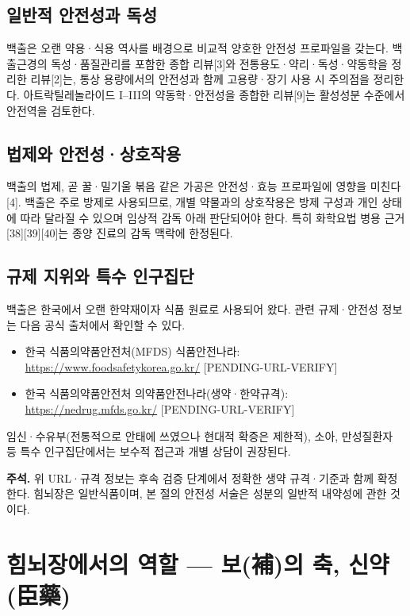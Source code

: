 \documentclass[12pt,oneside]{book}
\newenvironment{authnote}
  {\par\smallskip\begingroup\leftskip=6mm\rightskip=3mm\small\color{muted}\noindent\ignorespaces}
  {\par\endgroup\smallskip}
\begin{document}
\subsection{일반적 안전성과 독성}

백출은 오랜 약용·식용 역사를 배경으로 비교적 양호한 안전성 프로파일을 갖는다. 백출근경의 독성·품질관리를 포함한 종합 리뷰[3]와 전통용도·약리·독성·약동학을 정리한 리뷰[2]는, 통상 용량에서의 안전성과 함께 고용량·장기 사용 시 주의점을 정리한다. 아트락틸레놀라이드 I–III의 약동학·안전성을 종합한 리뷰[9]는 활성성분 수준에서 안전역을 검토한다.

\subsection{법제와 안전성·상호작용}

백출의 법제, 곧 꿀·밀기울 볶음 같은 가공은 안전성·효능 프로파일에 영향을 미친다[4]. 백출은 주로 방제로 사용되므로, 개별 약물과의 상호작용은 방제 구성과 개인 상태에 따라 달라질 수 있으며 임상적 감독 아래 판단되어야 한다. 특히 화학요법 병용 근거[38][39][40]는 종양 진료의 감독 맥락에 한정된다.

\subsection{규제 지위와 특수 인구집단}

백출은 한국에서 오랜 한약재이자 식품 원료로 사용되어 왔다. 관련 규제·안전성 정보는 다음 공식 출처에서 확인할 수 있다.

\begin{itemize}[leftmargin=6mm,itemsep=1pt,topsep=2pt]
  \item 한국 식품의약품안전처(MFDS) 식품안전나라: \url{https://www.foodsafetykorea.go.kr/} [PENDING-URL-VERIFY]
  \item 한국 식품의약품안전처 의약품안전나라(생약·한약규격): \url{https://nedrug.mfds.go.kr/} [PENDING-URL-VERIFY]
\end{itemize}

임신·수유부(전통적으로 안태에 쓰였으나 현대적 확증은 제한적), 소아, 만성질환자 등 특수 인구집단에서는 보수적 접근과 개별 상담이 권장된다.

\begin{authnote}\textbf{주석.} 위 URL·규격 정보는 후속 검증 단계에서 정확한 생약 규격·기준과 함께 확정한다. 힘뇌장은 일반식품이며, 본 절의 안전성 서술은 성분의 일반적 내약성에 관한 것이다.\end{authnote}

\section{힘뇌장에서의 역할 — 보(補)의 축, 신약(臣藥)}
\end{document}
